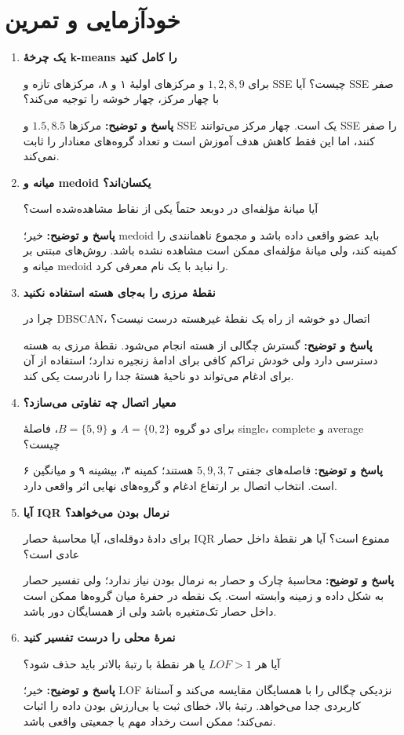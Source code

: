 \documentclass[12pt,a4paper,oneside]{report}
\newcounter{ex}[chapter]
\newenvironment{selftests}{\begin{enumerate}\setlength{\itemsep}{9pt}}{\end{enumerate}}
\newenvironment{selftest}[1]{\item\textbf{#1}\par}{\par}
\newcommand{\answer}[1]{\par{\color{teal}\bfseries پاسخ و توضیح: }#1\par}
\begin{document}
\section{خودآزمایی و تمرین}
\begin{selftests}
\begin{selftest}{یک چرخهٔ k-means را کامل کنید}
برای $1,2,8,9$ و مرکزهای اولیهٔ ۱ و ۸، مرکزهای تازه و SSE چیست؟ آیا SSE صفر با چهار مرکز، چهار خوشه را توجیه می‌کند؟
\answer{مرکزها $1.5,8.5$ و SSE یک است. چهار مرکز می‌توانند SSE را صفر کنند، اما این فقط کاهش هدف آموزش است و تعداد گروه‌های معنادار را ثابت نمی‌کند.}
\end{selftest}
\begin{selftest}{میانه و medoid یکسان‌اند؟}
آیا میانهٔ مؤلفه‌ای در دوبعد حتماً یکی از نقاط مشاهده‌شده است؟
\answer{خیر؛ medoid باید عضو واقعی داده باشد و مجموع ناهمانندی را کمینه کند، ولی میانهٔ مؤلفه‌ای ممکن است مشاهده نشده باشد. روش‌های مبتنی بر میانه و medoid را نباید با یک نام معرفی کرد.}
\end{selftest}
\begin{selftest}{نقطهٔ مرزی را به‌جای هسته استفاده نکنید}
چرا در DBSCAN، اتصال دو خوشه از راه یک نقطهٔ غیرهسته درست نیست؟
\answer{گسترش چگالی از هسته انجام می‌شود. نقطهٔ مرزی به هسته دسترسی دارد ولی خودش تراکم کافی برای ادامهٔ زنجیره ندارد؛ استفاده از آن برای ادغام می‌تواند دو ناحیهٔ هستهٔ جدا را نادرست یکی کند.}
\end{selftest}
\begin{selftest}{معیار اتصال چه تفاوتی می‌سازد؟}
برای دو گروه $A=\{0,2\}$ و $B=\{5,9\}$، فاصلهٔ single، complete و average چیست؟
\answer{فاصله‌های جفتی $5,9,3,7$ هستند؛ کمینه ۳، بیشینه ۹ و میانگین ۶ است. انتخاب اتصال بر ارتفاع ادغام و گروه‌های نهایی اثر واقعی دارد.}
\end{selftest}
\begin{selftest}{آیا IQR نرمال بودن می‌خواهد؟}
برای دادهٔ دو‌قله‌ای، آیا محاسبهٔ حصار IQR ممنوع است؟ آیا هر نقطهٔ داخل حصار عادی است؟
\answer{محاسبهٔ چارک و حصار به نرمال بودن نیاز ندارد؛ ولی تفسیر حصار به شکل داده و زمینه وابسته است. یک نقطه در حفرهٔ میان گروه‌ها ممکن است داخل حصار تک‌متغیره باشد ولی از همسایگان دور باشد.}
\end{selftest}
\begin{selftest}{نمرهٔ محلی را درست تفسیر کنید}
آیا هر $LOF>1$ یا هر نقطهٔ با رتبهٔ بالاتر باید حذف شود؟
\answer{خیر؛ LOF نزدیکی چگالی را با همسایگان مقایسه می‌کند و آستانهٔ کاربردی جدا می‌خواهد. رتبهٔ بالا، خطای ثبت یا بی‌ارزش بودن داده را اثبات نمی‌کند؛ ممکن است رخداد مهم یا جمعیتی واقعی باشد.}
\end{selftest}
\end{selftests}

\end{document}
